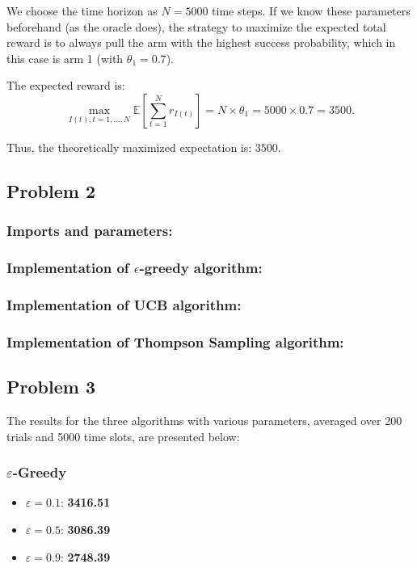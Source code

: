 \documentclass[11pt]{article}
\begin{document}
We choose the time horizon as \( N = 5000 \) time steps. If we know these parameters beforehand (as the oracle does), the strategy to maximize the expected total reward is to always pull the arm with the highest success probability, which in this case is arm 1 (with \(\theta_1 = 0.7\)).

The expected reward is:
\[
\max_{I(t), t = 1, \dots, N} \mathbb{E} \left[ \sum_{t=1}^{N} r_{I(t)} \right] = N \times \theta_1 = 5000 \times 0.7 = 3500.
\]

Thus, the theoretically maximized expectation is: $\boxed{3500.}$

\newpage
\subsection{Problem 2}

\subsubsection*{Imports and parameters:}


\subsubsection*{Implementation of $\epsilon$-greedy algorithm:}


\subsubsection*{Implementation of UCB algorithm:}


\subsubsection*{Implementation of Thompson Sampling algorithm:}


\newpage
\subsection{Problem 3}
The results for the three algorithms with various parameters, averaged over 200 trials and 5000 time slots, are presented below:

\subsubsection*{\(\varepsilon\)-Greedy}
\begin{itemize}
    \item \(\varepsilon = 0.1\): \textbf{3416.51}
    \item \(\varepsilon = 0.5\): \textbf{3086.39}
    \item \(\varepsilon = 0.9\): \textbf{2748.39}
\end{itemize}
\end{document}
